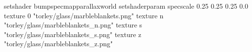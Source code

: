 setshader bumpspecmapparallaxworld
setshaderparam specscale 0.25 0.25 0.25 0.0
texture 0 "torley/glass/marbleblankets.png"
texture n "torley/glass/marbleblankets_n.png"
texture s "torley/glass/marbleblankets_s.png"
texture z "torley/glass/marbleblankets_z.png"

